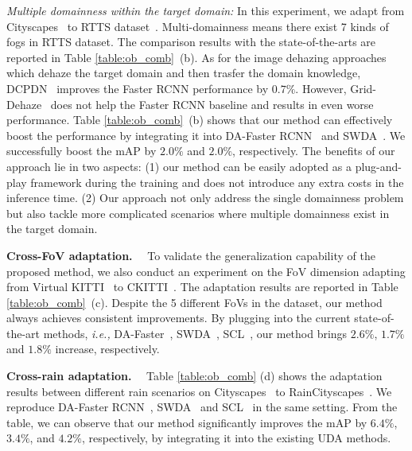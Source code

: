 \documentclass[10pt,journal,compsoc]{IEEEtran}
\renewcommand{\paragraph}[1]{\noindent\textbf{#1}~~}
\begin{document}
\noindent \emph{Multiple domainness within the target domain:} In this experiment, we adapt from Cityscapes~\cite{cordts2016cityscapes} to RTTS dataset~\cite{RTTS}. Multi-domainness means there exist 7 kinds of fogs in RTTS dataset.
The comparison results with the state-of-the-arts are reported in Table \ref{table:ob_comb}~(b). As for the image dehazing approaches which dehaze the target domain and then trasfer the domain knowledge, DCPDN~\cite{zhang2018densely} improves the Faster RCNN performance by $0.7\%$. However, Grid-Dehaze~\cite{liu2019griddehazenet} does not help the Faster RCNN baseline and results in even worse performance. 
Table \ref{table:ob_comb}~(b) shows that our method can effectively boost the performance by integrating it into   DA-Faster RCNN~\cite{DA-Faster-RCNN} and SWDA~\cite{SWDA}. We successfully boost the mAP by $2.0\%$ and $2.0\%$, respectively. The benefits of our approach lie in two aspects: (1) our method can be easily adopted as a plug-and-play framework during the training and does not introduce any extra costs in the inference time. (2) Our approach not only address the single domainness problem but also tackle more complicated scenarios where multiple domainness exist in the target domain.




\paragraph{Cross-FoV adaptation.} To validate the generalization capability of the proposed method, we also conduct an experiment on the FoV dimension adapting from Virtual KITTI~\cite{VKITTI} to CKITTI~\cite{cordts2016cityscapes,kITTI}. 
The adaptation results are reported in Table \ref{table:ob_comb}~(c). Despite the 5 different FoVs in the dataset, our method always achieves consistent improvements. By plugging into the current state-of-the-art methods, \emph{i.e.,} DA-Faster~\cite{DA-Faster-RCNN}, SWDA~\cite{SWDA}, SCL~\cite{SCL},
our method brings $2.6\%$, $1.7\%$ and $1.8\%$ increase, respectively.



\paragraph{Cross-rain adaptation.} 
Table \ref{table:ob_comb} (d) shows the adaptation results between different rain scenarios on Cityscapes~\cite{cordts2016cityscapes} to RainCityscapes~\cite{rainy_city}. We reproduce DA-Faster RCNN~\cite{DA-Faster-RCNN},  SWDA~\cite{SWDA} and SCL~\cite{SCL} in the same setting. From the table, we can observe that our method significantly improves the mAP by $6.4\%$, $3.4\%$, and $4.2\%$, respectively, by integrating it into the existing UDA methods.
\end{document}
